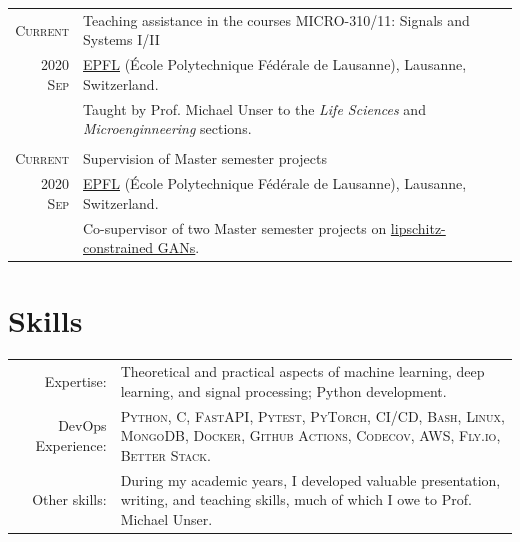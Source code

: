 \documentclass[a4paper,11pt]{article}
\begin{document}
    \begin{tabular}{r|p{13cm}}

	  \textsc{Current}     & Teaching assistance in the courses MICRO-310/11: Signals and Systems I/II \\
	  \textsc{2020 Sep} & \footnotesize{\href{https://www.epfl.ch/en/}{EPFL} (École Polytechnique Fédérale de Lausanne), Lausanne, Switzerland.} \\
    & \footnotesize{Taught by Prof. Michael Unser to the \emph{Life Sciences} and \emph{Microenginneering} sections.} \\

    \multicolumn{2}{c}{} \\

    \textsc{Current}	 & Supervision of Master semester projects \\
    \textsc{2020 Sep}  & \footnotesize{\href{https://www.epfl.ch/en/}{EPFL} (École Polytechnique Fédérale de Lausanne), Lausanne, Switzerland.} \\
    & \footnotesize{Co-supervisor of two Master semester projects on \href{https://bigwww.epfl.ch/teaching/projects/abstract.html?f=00388}{lipschitz-constrained GANs}.} \\

    \end{tabular}


    \vspace{18pt}

    \section{Skills}

    \begin{tabular}{rp{11cm}}
  	Expertise:  & Theoretical and practical aspects of machine learning, deep learning, and signal processing; Python development.
    \vspace{5pt}\\
  	DevOps Experience:       &  \textsc{Python, C, FastAPI, Pytest, PyTorch, CI/CD, Bash, Linux, MongoDB, Docker, Github Actions, Codecov, AWS, Fly.io, Better Stack.}  \vspace{5pt}\\
  	Other skills: 	   & During my academic years, I developed valuable presentation, writing, and teaching skills, much of which I owe to Prof. Michael Unser.
    \end{tabular}
\end{document}
